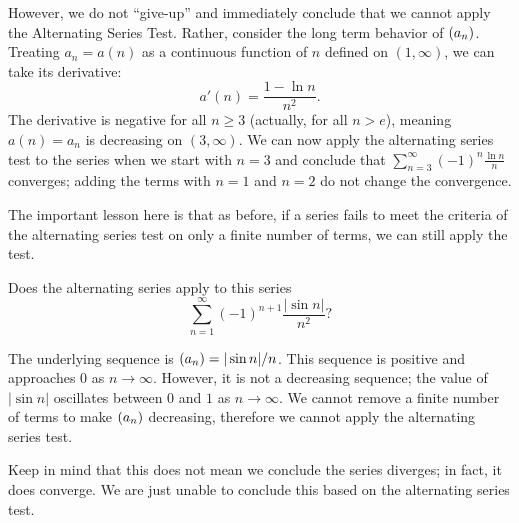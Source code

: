 \documentclass{ximera}
\begin{document}
\begin{question}
\begin{question}
\begin{prompt}
\begin{feedback}
        However, we do not ``give-up'' and immediately conclude that we
        cannot apply the Alternating Series Test. Rather, consider the
        long term behavior of $\left( a_n \right)$. Treating $a_n=a(n)$ as a
        continuous function of $n$ defined on $(1,\infty)$, we can take
        its derivative:
        \[
        a'(n) = \frac{1-\ln n}{n^2}.
        \]
        The derivative is negative for all $n\geq 3$ (actually, for
        all $n>e$), meaning $a(n)=a_n$ is decreasing on
        $(3,\infty)$. We can now apply the alternating series test to
        the series when we start with $n=3$ and conclude that
        $\sum_{n=3}^\infty(-1)^n\frac{\ln n}{n}$ converges; adding the
        terms with $n=1$ and $n=2$ do not change the convergence.
        
        The important lesson here is that as before, if a series fails
        to meet the criteria of the alternating series test on only a
        finite number of terms, we can still apply the test.
      \end{feedback}
    \end{prompt}
    \begin{question}
      Does the alternating series apply to this series
      \[
      \sum_{n=1}^\infty (-1)^{n+1}\frac{|\sin n|}{n^2}?
      \]
      \begin{prompt}
        \begin{multipleChoice}
        \end{multipleChoice}
        \begin{feedback}
          The underlying sequence is $\left( a_n \right) = |\sin n|/n$. This
          sequence is positive and approaches $0$ as
          $n\to\infty$. However, it is not a decreasing sequence; the
          value of $|\sin n|$ oscillates between $0$ and $1$ as
          $n\to\infty$. We cannot remove a finite number of terms to
          make $\left( a_n \right)$ decreasing, therefore we cannot apply the
          alternating series test.
	  
          Keep in mind that this does not mean we conclude the series
          diverges; in fact, it does converge. We are just unable to
          conclude this based on the alternating series test.
        \end{feedback}
      \end{prompt}
    \end{question}
  \end{question}
\end{question}
\end{document}
